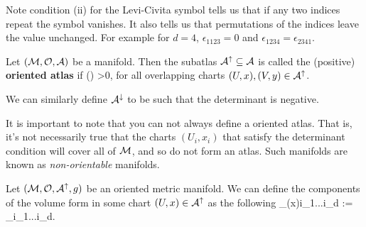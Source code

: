 \br 
    Note condition (ii) for the Levi-Civita symbol tells us that if any two indices repeat the symbol vanishes. It also tells us that permutations of the indices leave the value unchanged. For example for $d=4$, $\epsilon_{1123} = 0$ and $\epsilon_{1234}=\epsilon_{2341}$.
\er 

    Let $(\mathcal{M},\mathcal{O},\mathcal{A})$ be a manifold. Then the subatlas $\mathcal{A}^{\uparrow}\subseteq \mathcal{A}$ is called the (positive) \textbf{oriented atlas} if 
    \bse 
        \det\bigg(\bigg) >0,
    \ese 
    for all overlapping charts $(U,x),(V,y)\in\mathcal{A}^{\uparrow}$.
\ed 

We can similarly define $\mathcal{A}^{\downarrow}$ to be such that the determinant is negative.

\br 
    It is important to note that you can not always define a oriented atlas. That is, it's not necessarily true that the charts $(U_i,x_i)$ that satisfy the determinant condition will cover all of $\mathcal{M}$, and so do not form an atlas. Such manifolds are known as \textit{non-orientable} manifolds. 
\er 

\bcl 
    Let $(\mathcal{M},\mathcal{O},\mathcal{A}^{\uparrow},g)$ be an oriented metric manifold. We can define the components of the volume form in some chart $(U,x)\in\mathcal{A}^{\uparrow}$ as the following 
    \bse 
        \Omega_{(x)i_1...i_d} :=  \,  \epsilon_{i_1...i_d}.
    \ese 
\ecl 

